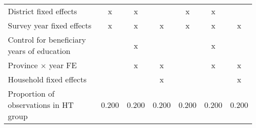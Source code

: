 {\begin{tabular}{l*{6}{c}}
District fixed effects&           x         &           x         &                     &           x         &           x         &                     \\
Survey year fixed effects&           x         &           x         &           x         &           x         &           x         &           x         \\
Control for beneficiary years of education&                     &           x         &                     &                     &           x         &                     \\
Province $\times$  year FE&                     &           x         &           x         &                     &           x         &           x         \\
Household fixed effects&                     &                     &           x         &                     &                     &           x         \\
Proportion of observations in HT group&       0.200         &       0.200         &       0.200         &       0.200         &       0.200         &       0.200         \\
\bottomrule
\end{tabular}
}
